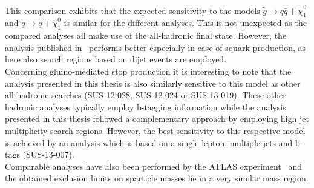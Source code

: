 \\
This comparison exhibits that the expected sensitivity to the models $\tilde{g} \rightarrow q\bar{q} + \tilde{\chi}_1^0$ and $\tilde{q} \rightarrow q + \tilde{\chi}_1^0$ is similar for the different analyses. This is not unexpected as the compared analyses all make use of the all-hadronic final state. However, the analysis published in~\cite{CMS-PAS-SUS-13-019} performs better especially in case of squark production, as here also search regions based on dijet events are employed. \\
Concerning gluino-mediated stop production it is interesting to note that the analysis presented in this thesis is also similarly sensitive to this model as other all-hadronic searches (\cf SUS-12-028, SUS-12-024 or SUS-13-019). These other hadronic analyses typically employ b-tagging information while the analysis presented in this thesis followed a complementary approach by employing high jet multiplicity search regions. However, the best sensitivity to this respective model is achieved by an analysis which is based on a single lepton, multiple jets and b-tags (SUS-13-007). 
\\
Comparable analyses have also been performed by the ATLAS experiment~\cite{Aad:2013wta, Aad:2014wea, Aad:2014lra} and the obtained exclusion limits on sparticle masses lie in a very similar mass region.

